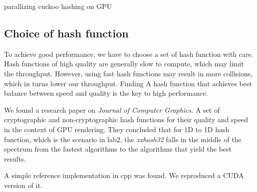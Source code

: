 \documentclass{article}
\begin{document}
\begin{algorithm}[htbp]
	\caption{parallizing cuckoo hashing on GPU}
	\label{algo:gpucuckoo}

\end{algorithm}

\pagebreak

\subsection{Choice of hash function}

To achieve good performance, we have to choose a set of hash function with care.
Hash functions of high quality are generally slow to compute, which may limit the throughput.
However, using fast hash functions may result in more collisions, which in turns lower our throughput.
Finding A hash function that achieves best balance between speed and quality is the key to high performance.

We found a research paper {}\cite{paper:hashfuncperfgpu} on \textit{Journal of Computer Graphics}.
A set of cryptographic and non-cryptographic hash functions for their quality and speed in the context of GPU rendering.
They concluded that for 1D to 1D hash function, which is the scenario in lab2, the \emph{xxhash32} falls in the middle of the spectrum from the fastest algorithms to the algorithms that yield the best results.\par

A simple reference implementation {}\cite{blog:xxhimpl} in cpp was found. We reproduced a CUDA version of it.\par
\end{document}
